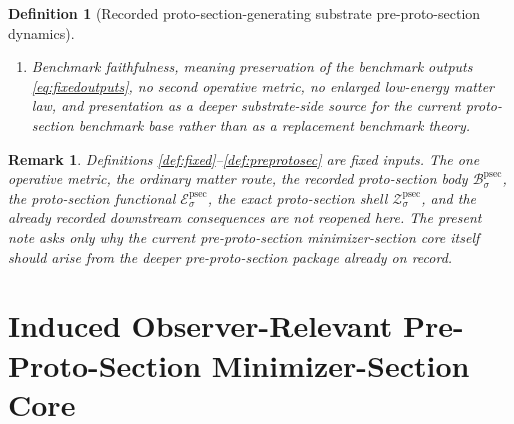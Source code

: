 \documentclass[11pt]{article}
\newcommand{\ProtoSectionBody}[1]{\mathcal B_{#1}^{\mathrm{psec}}}
\newcommand{\ProtoSectionFunctional}[1]{\mathscr E_{#1}^{\mathrm{psec}}}
\newcommand{\ProtoSectionShell}[1]{\mathcal Z_{#1}^{\mathrm{psec}}}
\newcommand{\PreProtoSectionProj}[1]{\Pi_{#1}^{\mathrm{ppsec}}}
\newcommand{\PreProtoSectionFiber}[2]{\mathcal F_{#1}^{\mathrm{ppsec}}(#2)}
\newcommand{\PreProtoSectionFunctional}[1]{\mathscr F_{#1}^{\mathrm{ppsec}}}
\newcommand{\PreProtoSectionShell}[1]{\mathcal Z_{#1}^{\mathrm{ppsec}}}
\newtheorem{definition}{Definition}
\newtheorem{remark}{Remark}
\begin{document}
\begin{definition}[Recorded proto-section-generating substrate pre-proto-section dynamics]
\begin{enumerate}
\[    \begin{array}{l}
    \PreProtoSectionProj{\sigma}(u)\in\ProtoSectionShell{\sigma},\\[0.2em]
    \PreProtoSectionFunctional{\sigma}(u)
    =
    \displaystyle\min_{v\in\PreProtoSectionFiber{\sigma}{\PreProtoSectionProj{\sigma}(u)}}
    \PreProtoSectionFunctional{\sigma}(v)
    \end{array}
    \right\},
    \]
    and
    \[
    \PreProtoSectionProj{\sigma}\big|_{\PreProtoSectionShell{\sigma}}
    :
    \PreProtoSectionShell{\sigma}
    \xrightarrow{\cong}
    \ProtoSectionShell{\sigma}
    \]
    is a diffeomorphism.
    \item Benchmark faithfulness, meaning preservation of the benchmark outputs \eqref{eq:fixedoutputs}, no second operative metric, no enlarged low-energy matter law, and presentation as a deeper substrate-side source for the current proto-section benchmark base rather than as a replacement benchmark theory.
\end{enumerate}
\end{definition}

\begin{remark}
Definitions \ref{def:fixed}--\ref{def:preprotosec} are fixed inputs. The one operative metric, the ordinary matter route, the recorded proto-section body \(\ProtoSectionBody{\sigma}\), the proto-section functional \(\ProtoSectionFunctional{\sigma}\), the exact proto-section shell \(\ProtoSectionShell{\sigma}\), and the already recorded downstream consequences are not reopened here. The present note asks only why the current pre-proto-section minimizer-section core itself should arise from the deeper pre-proto-section package already on record.
\end{remark}

\section{Induced Observer-Relevant Pre-Proto-Section Minimizer-Section Core}
\end{document}
